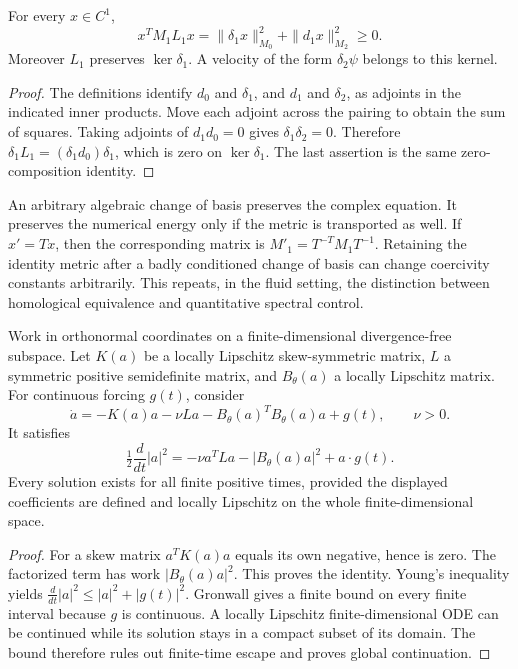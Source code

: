 \begin{proposition}
\label{prop:fluid-discrete-hodge}
For every $x\in C^1$,
\[
 x^TM_1L_1x=\|\delta_1x\|_{M_0}^2+\|d_1x\|_{M_2}^2\ge0.
\]
Moreover $L_1$ preserves $\ker\delta_1$. A velocity of the form $\delta_2\psi$ belongs to this kernel.
\end{proposition}
\begin{proof}
The definitions identify $d_0$ and $\delta_1$, and $d_1$ and $\delta_2$, as adjoints in the indicated inner products. Move each adjoint across the pairing to obtain the sum of squares. Taking adjoints of $d_1d_0=0$ gives $\delta_1\delta_2=0$. Therefore
$\delta_1L_1=(\delta_1d_0)\delta_1$, which is zero on $\ker\delta_1$. The last assertion is the same zero-composition identity.
\end{proof}

An arbitrary algebraic change of basis preserves the complex equation. It preserves the numerical energy only if the metric is transported as well. If $x'=Tx$, then the corresponding matrix is $M'_1=T^{-T}M_1T^{-1}$. Retaining the identity metric after a badly conditioned change of basis can change coercivity constants arbitrarily. This repeats, in the fluid setting, the distinction between homological equivalence and quantitative spectral control.

\begin{theorem}
\label{thm:fluid-finite-closure}
Work in orthonormal coordinates on a finite-dimensional divergence-free subspace. Let $K(a)$ be a locally Lipschitz skew-symmetric matrix, $L$ a symmetric positive semidefinite matrix, and $B_\theta(a)$ a locally Lipschitz matrix. For continuous forcing $g(t)$, consider
\[
 \dot a=-K(a)a-\nu La-B_\theta(a)^TB_\theta(a)a+g(t),\qquad\nu>0.
\]
It satisfies
\[
 \tfrac12\frac d{dt}|a|^2
 =-\nu a^TLa-|B_\theta(a)a|^2+a\cdot g(t).
\]
Every solution exists for all finite positive times, provided the displayed coefficients are defined and locally Lipschitz on the whole finite-dimensional space.
\end{theorem}
\begin{proof}
For a skew matrix $a^TK(a)a$ equals its own negative, hence is zero. The factorized term has work $|B_\theta(a)a|^2$. This proves the identity. Young's inequality yields
$\frac d{dt}|a|^2\le |a|^2+|g(t)|^2$.
Gronwall gives a finite bound on every finite interval because $g$ is continuous. A locally Lipschitz finite-dimensional ODE can be continued while its solution stays in a compact subset of its domain. The bound therefore rules out finite-time escape and proves global continuation.
\end{proof}

